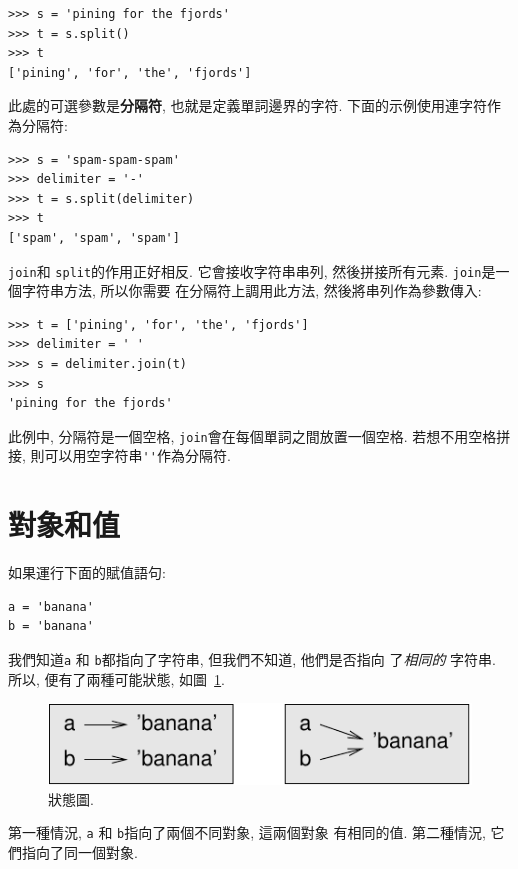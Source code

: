 \documentclass[10pt]{book}
\begin{document}
\begin{verbatim}
>>> s = 'pining for the fjords'
>>> t = s.split()
>>> t
['pining', 'for', 'the', 'fjords']
\end{verbatim}
%
此處的可選參數是{\bf 分隔符}, 也就是定義單詞邊界的字符. 
下面的示例使用連字符作為分隔符:

\begin{verbatim}
>>> s = 'spam-spam-spam'
>>> delimiter = '-'
>>> t = s.split(delimiter)
>>> t
['spam', 'spam', 'spam']
\end{verbatim}
%
{\tt join}和 {\tt split}的作用正好相反. 
它會接收字符串串列, 然後拼接所有元素. 
{\tt join}是一個字符串方法, 所以你需要
在分隔符上調用此方法, 然後將串列作為參數傳入:

\begin{verbatim}
>>> t = ['pining', 'for', 'the', 'fjords']
>>> delimiter = ' '
>>> s = delimiter.join(t)
>>> s
'pining for the fjords'
\end{verbatim}
%
此例中, 分隔符是一個空格, 
{\tt join}會在每個單詞之間放置一個空格. 
若想不用空格拼接, 則可以用空字符串\verb"''"作為分隔符. 


\section{對象和值}
\label{equivalence}

如果運行下面的賦值語句:

\begin{verbatim}
a = 'banana'
b = 'banana'
\end{verbatim}
%
我們知道{\tt a} 和 {\tt b}都指向了字符串, 但我們不知道, 他們是否指向
了{\em 相同的} 字符串. 
所以, 便有了兩種可能狀態, 如圖~\ref{fig.list1}.

\begin{figure}
\centerline
{\includegraphics[scale=0.8]{figs/list1.pdf}}
\caption{狀態圖.}
\label{fig.list1}
\end{figure}

第一種情況, {\tt a} 和 {\tt b}指向了兩個不同對象, 這兩個對象
有相同的值. 第二種情況, 它們指向了同一個對象. 
\end{document}
